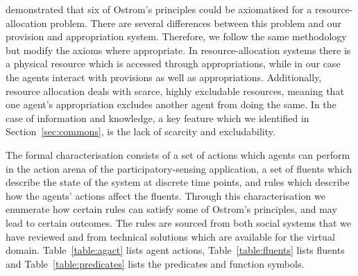  demonstrated that six of Ostrom's principles could be axiomatised for a resource-allocation problem. There are several differences between this problem and our provision and appropriation system. 
Therefore, we follow the same methodology but modify the axioms where appropriate. 
In resource-allocation systems there is a physical resource which is accessed through appropriations, while in our case the agents interact with provisions as well as appropriations. 
Additionally, resource allocation deals with scarce, highly excludable resources, meaning that  one agent's appropriation excludes another agent from doing the same. 
In the case of information and knowledge, a key feature which we identified in Section~\ref{sec:commons}, is the lack of scarcity and excludability. 

The formal characterisation consists of a set of actions which agents can perform in the action arena of the participatory-sensing application, a set of fluents which describe the state of the system at discrete time points, and rules which describe how the agents' actions affect the fluents. Through this characterisation we enumerate how certain rules can satisfy some of Ostrom's principles, and may lead to certain outcomes. The rules are sourced from both social systems that we have reviewed and from technical solutions which are available for the virtual domain. Table~\ref{table:agact} lists agent actions, Table~\ref{table:fluents} lists fluents and Table~\ref{table:predicates} lists the
predicates and function symbols.

